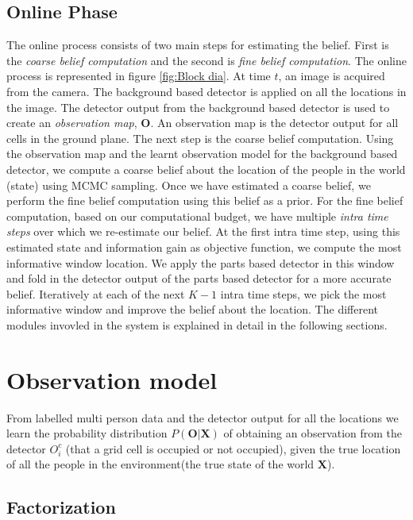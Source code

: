 \documentclass[10pt,twocolumn,letterpaper]{article}
\begin{document}
\subsection{Online Phase}
The online process consists of two main steps for estimating the belief. First is the \textit{coarse belief computation} and the second is \textit{fine belief computation}. The online process is represented in figure \ref{fig:Block dia}.
At time $t $, an image is acquired from the camera. The background based detector is applied on all the locations in the image. The detector output from the background based detector is used to create an \textit{observation map}, $\textbf{O}$. An observation map is the detector output for all cells in the ground plane.
The next step is the coarse belief computation. Using the observation map and the learnt observation model for the background based detector, we compute a coarse belief about the location of the people in the world (state) using MCMC sampling.
Once we have estimated a coarse belief, we perform the fine belief computation using this belief as a prior.
For the fine belief computation, based on our computational budget, we have multiple \emph{intra time steps} over which we re-estimate our belief.
At the first intra time step, using this estimated state and information gain as objective function, we compute the most informative window location.
We apply the parts based detector in this window and fold in the detector output of the parts based detector for a more accurate belief.
Iteratively at each of the next $K-1$ intra time steps, we pick the most informative window and improve the belief about the location.
The different modules invovled in the system is explained in detail in the following sections.
\section{Observation model} \label{sec:obs}
From labelled multi person data and the detector output for all the locations we learn the probability distribution $ P(\textbf{O}|\textbf{X}) $ of
obtaining an observation from the detector $ O^{c}_{i} $ (that a grid cell is occupied or not occupied), given the true location of all the people in the environment(the true state of the world $\textbf{X}$).
\subsection{Factorization}
\end{document}
